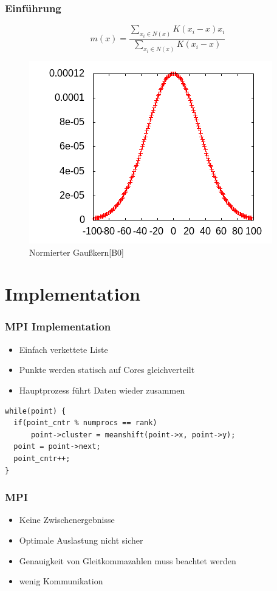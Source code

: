 \documentclass[10pt,utf8]{beamer}
\begin{document}
\begin{frame}
	\frametitle{Einf\"uhrung}
 		\[ m(x) = \frac{\sum_{x_i \in N(x)} K(x_i - x) x_i }{\sum_{x_i \in N(x)} K(x_i - x)} \]
		\vspace{-10pt}
		\begin{figure}[H]
			\centering
			\includegraphics[scale=0.7]{../output/pics/gauss.png}
			\caption{Normierter Gaußkern[B0]}
		\end{figure}
\end{frame}

\section{Implementation}
\begin{frame}[fragile]
	\frametitle{MPI Implementation}
	\begin{itemize}
		\item Einfach verkettete Liste
		\item Punkte werden statisch auf Cores gleichverteilt
		\item Hauptprozess führt Daten wieder zusammen
	\end{itemize}
	\begin{lstlisting}
while(point) {
  if(point_cntr % numprocs == rank)
      point->cluster = meanshift(point->x, point->y);
  point = point->next;
  point_cntr++;
}
	\end{lstlisting}
\end{frame}
\begin{frame}
	\frametitle{MPI}
	\begin{itemize}
		\item Keine Zwischenergebnisse
		\item Optimale Auslastung nicht sicher
		\item Genauigkeit von Gleitkommazahlen muss beachtet werden
		\item wenig Kommunikation
	\end{itemize}
\end{frame}
\end{document}
